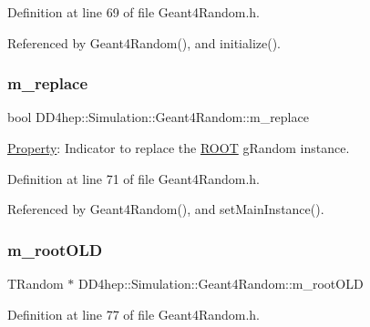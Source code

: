 Definition at line 69 of file Geant4\+Random.\+h.



Referenced by Geant4\+Random(), and initialize().

\hypertarget{class_d_d4hep_1_1_simulation_1_1_geant4_random_a3d14b4420a812cdb4e0965f77e3f5988}{}\label{class_d_d4hep_1_1_simulation_1_1_geant4_random_a3d14b4420a812cdb4e0965f77e3f5988} 
\subsubsection{\texorpdfstring{m\+\_\+replace}{m\_replace}}
{\footnotesize\ttfamily bool D\+D4hep\+::\+Simulation\+::\+Geant4\+Random\+::m\+\_\+replace\hspace{0.3cm}{\ttfamily [protected]}}



\hyperlink{class_d_d4hep_1_1_property}{Property}\+: Indicator to replace the \hyperlink{namespace_r_o_o_t}{R\+O\+OT} g\+Random instance. 



Definition at line 71 of file Geant4\+Random.\+h.



Referenced by Geant4\+Random(), and set\+Main\+Instance().

\hypertarget{class_d_d4hep_1_1_simulation_1_1_geant4_random_a55a93202818178faaeabd4ae322a208e}{}\label{class_d_d4hep_1_1_simulation_1_1_geant4_random_a55a93202818178faaeabd4ae322a208e} 
\subsubsection{\texorpdfstring{m\+\_\+root\+O\+LD}{m\_rootOLD}}
{\footnotesize\ttfamily T\+Random $\ast$ D\+D4hep\+::\+Simulation\+::\+Geant4\+Random\+::m\+\_\+root\+O\+LD\hspace{0.3cm}{\ttfamily [protected]}}



Definition at line 77 of file Geant4\+Random.\+h.



